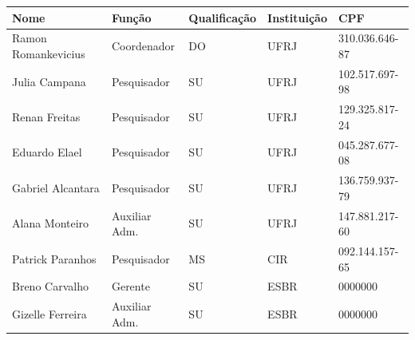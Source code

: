 \begin{onecolumn}
\thispagestyle{empty}


\begin{center}

  
 \vfill



  
  \vspace{0.50cm}



  \begin{center}
    \begin{tabular}{| l | l | l | l | l |}
    
    \hline
   	 Nome 					& Função			 & Qualificação 	& Instituição	 & CPF \\ \hline
   	 Ramon Romankevicius 		& Coordenador 	& DO			 & UFRJ 		& 310.036.646-87\\			\hline
   	Julia Campana 			& Pesquisador		 & SU 			& UFRJ 	& 102.517.697-98\\ 			\hline
   	Renan Freitas 				& Pesquisador 		& SU 			& UFRJ 	& 129.325.817-24\\ 		
   	\hline Eduardo Elael 				& Pesquisador 		& SU 			& UFRJ	 & 045.287.677-08\\ 			\hline
  	Gabriel Alcantara 			& Pesquisador 		& SU 			& UFRJ 	& 136.759.937-79\\
  	\hline
   	Alana Monteiro 			 & Auxiliar Adm.	 & SU 			& UFRJ 	& 147.881.217-60\\ 		
   	\hline Patrick  Paranhos 			& Pesquisador 		& MS 			& CIR 	& 092.144.157-65\\ \hline
	Breno Carvalho				 & Gerente 		& SU 			& ESBR 	& 0000000\\ 	
\hline
	Gizelle Ferreira 			& Auxiliar Adm. 	& SU 			& ESBR 	& 0000000\\ 
\hline

    
    \hline 
    \end{tabular}
\end{center}

\end{center}
\end{onecolumn}

\newpage

\hypersetup{pageanchor=true}

